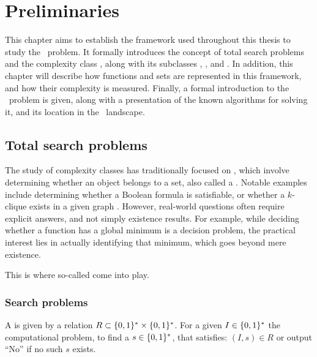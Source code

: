\setchapterpreamble[u]{\margintoc}
\chapter{Preliminaries}

This chapter aims to establish the framework used throughout this thesis to study the \Tarski\ problem. It formally introduces the concept of total search problems and the complexity class \TFNP, along with its subclasses \PLS, \PPAD, and \EOPL. In addition, this chapter will describe how functions and sets are represented in this framework, and how their complexity is measured. Finally, a formal introduction to the \Tarski\ problem is given, along with a presentation of the known algorithms for solving it, and its location in the \TFNP\ landscape.

\section{Total search problems}

The study of complexity classes has traditionally focused on , which involve determining whether an object belongs to a set, also called a . Notable examples include determining whether a Boolean formula is satisfiable, or whether a $k$-clique exists in a given graph . However, real-world questions often require explicit answers, and not simply existence results. For example, while deciding whether a function has a global minimum is a decision problem, the practical interest lies in actually identifying that minimum, which goes beyond mere existence.

This is where so-called  come into play.

\subsection{Search problems}

\begin{definition}
    A  is given by a relation $R\subset \{0, 1\}^* \times \{0, 1\}^*$. For a given  $I\in \{0, 1\}^*$ the computational problem, to find a  $s \in \{0, 1\}^*$, that satisfies: $(I, s) \in R$ or output ``No'' if no such $s$ exists.
\end{definition}

